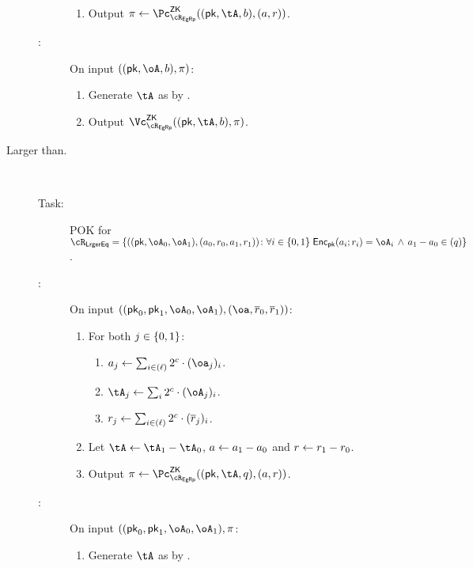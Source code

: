 \begin{description}
\begin{description}
\begin{enumerate}
        \item  Output $\pi \asn \pZK{\rEgRp}((\pk,\tA,b), (a,r))$.
        
	\end{enumerate}
	
	
\item[\Vc:] On input $((\pk,\oA,b),\pi)$:
	
	\begin{enumerate}
		\item   Generate $\tA$ as by \Pc.
		\item  Output $\vZK{\rEgRp}((\pk,\tA,b), \pi)$.
		
	\end{enumerate}
	
	
\end{description}

		
\item[Larger than.]~  

\begin{description}
	\item[Task:] POK for $\rLrgEq =\rLrgEqDef$.
	
		\item[\Pc:]  On input $((\pk_0,\pk_1,\oA_0,\oA_1),(\oa,\orr_0,\orr_1))$: 
	
	
	\begin{enumerate}
		
		\item For both $j\in \zo$:
		
		\begin{enumerate}
			\item   $a_j \asn  \sum_{i\in (\ell)}    2^c \cdot (\oa_j)_i$. 
			
				\item    $\tA_j \asn  \sum_i  2^c \cdot (\oA_j)_i$. 
				\item    $r_j \leftarrow  \sum_{i\in (\ell)}  2^c \cdot (\overline{r}_j)_i$. 
				   
		\end{enumerate}
		
		\item Let $\tA \asn \tA_1 - \tA_0$, $a \leftarrow a_1 - a_0$ and $r \leftarrow r_1 - r_0$.
		\item  Output $\pi \asn \pZK{\rEgRp}((\pk,\tA,q), (a,r))$.
	\end{enumerate}
	
	
	\item[\Vc:]  On input $((\pk_0,\pk_1,\oA_0,\oA_1),\pi$: 
	
	\begin{enumerate}
		\item  Generate $\tA$ as by \Pc.
		

\end{enumerate}
\end{description}
\end{description}
